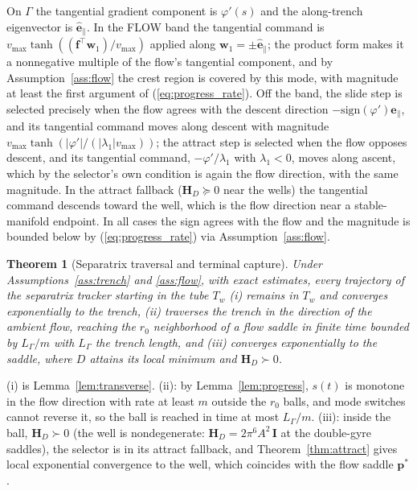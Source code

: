 \documentclass[lettersize,journal]{IEEEtran}
\newtheorem{theorem}{Theorem}
\begin{document}
\begin{IEEEproof}
On $\Gamma$ the tangential gradient component is $\varphi'(s)$ and the
along-trench eigenvector is $\hat{\mathbf{e}}_\parallel$. In the FLOW band
the tangential command is $v_{\max}\tanh((\mathbf{f}^\top
\mathbf{w}_1)/v_{\max})$ applied along $\mathbf{w}_1 = \pm
\hat{\mathbf{e}}_\parallel$; the product form makes it a nonnegative
multiple of the flow's tangential component, and by
Assumption~\ref{ass:flow} the crest region is covered by this mode, with
magnitude at least the first argument of (\ref{eq:progress_rate}). Off
the band, the slide step is selected precisely when the flow agrees with the
descent direction $-\mathrm{sign}(\varphi')\hat{\mathbf{e}}_\parallel$,
and its tangential command moves along descent with magnitude
$v_{\max}\tanh(|\varphi'|/(|\lambda_1| v_{\max}))$; the attract step is selected
when the flow opposes descent, and its tangential command,
$-\varphi'/\lambda_1$ with $\lambda_1 < 0$, moves along ascent, which by
the selector's own condition is again the flow direction, with the same
magnitude. In the attract fallback ($\mathbf{H}_D \succeq 0$ near the
wells) the tangential command descends toward the well, which is the
flow direction near a stable-manifold endpoint. In all cases the sign
agrees with the flow and the magnitude is bounded below by
(\ref{eq:progress_rate}) via Assumption~\ref{ass:flow}.
\end{IEEEproof}

\begin{theorem}[Separatrix traversal and terminal capture]
\label{thm:separatrix}
Under Assumptions~\ref{ass:trench} and \ref{ass:flow}, with exact
estimates, every trajectory of the separatrix tracker starting in the
tube $T_w$
(i) remains in $T_w$ and converges exponentially to the trench, (ii)
traverses the trench in the direction of the ambient flow, reaching the
$r_0$ neighborhood of a flow saddle in finite time bounded by
$L_\Gamma/m$ with $L_\Gamma$ the trench length, and (iii) converges
exponentially to the saddle, where $D$ attains its local minimum and
$\mathbf{H}_D \succ 0$.
\end{theorem}

\begin{IEEEproof}
(i) is Lemma~\ref{lem:transverse}. (ii): by Lemma~\ref{lem:progress},
$s(t)$ is monotone in the flow direction with rate at least $m$ outside
the $r_0$ balls, and mode switches cannot reverse it, so the ball is
reached in time at most $L_\Gamma/m$. (iii): inside the ball,
$\mathbf{H}_D \succ 0$ (the well is nondegenerate:
$\mathbf{H}_D = 2\pi^6 A^2\,\mathbf{I}$ at the double-gyre saddles), the
selector is in its attract fallback, and Theorem~\ref{thm:attract} gives
local exponential convergence to the well, which coincides with the flow
saddle $\mathbf{p}^*$.
\end{IEEEproof}
\end{document}
